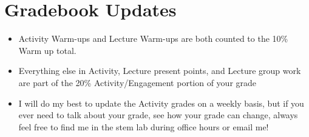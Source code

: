 \documentclass{article}
\begin{document}
\vspace{2cm}
\section*{Gradebook Updates}

\begin{itemize}
    \item Activity Warm-ups and Lecture Warm-ups are both 
          counted to the 10\% Warm up total. 
        
    \item Everything else in Activity, Lecture present points, and 
    Lecture group work are part of the 20\% 
    Activity/Engagement portion of your grade
    
    \item I will do my best to update the Activity grades on a weekly basis, 
but if you ever need to talk about your grade, see how your grade 
can change, always feel free to find me in the stem lab during 
office hours or email me!

\end{itemize}
\vspace{2cm}
\end{document}
